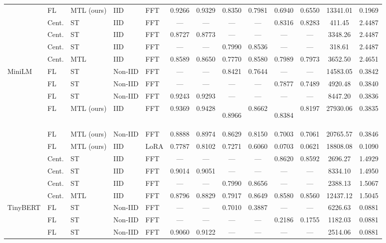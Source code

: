 \begin{table}[t]
\begin{tabular}{lllllcccccccc}
      & FL & MTL (ours) & IID & FFT & 0.9266 & 0.9329 & 0.8350 & 0.7981 & 0.6940 & 0.6550 & 13341.01 & 0.1969 \\
     & Cent. & ST & IID & FFT & --- & --- & --- & --- & 0.8316 & 0.8283 & 411.45 & 2.4487 \\
     & Cent. & ST & IID & FFT & 0.8727 & 0.8773 & --- & --- & --- & --- & 3348.26 & 2.4487 \\
     & Cent. & ST & IID & FFT & --- & --- & 0.7990 & 0.8536 & --- & --- & 318.61 & 2.4487 \\
     & Cent. & MTL & IID & FFT & 0.8589 & 0.8650 & 0.7770 & 0.8580 & 0.7989 & 0.7973 & 3652.50 & 2.4651 \\
    \midrule
    MiniLM \cite{wang2020minilm} & FL & ST & Non-IID & FFT & --- & --- & 0.8421 & 0.7644 & --- & --- & 14583.05 & 0.3842 \\
     & FL & ST & Non-IID & FFT & --- & --- & --- & --- & 0.7877 & 0.7489 & 4920.48 & 0.3840 \\
     & FL & ST & Non-IID & FFT & 0.9243 & 0.9293 & --- & --- & --- & --- & 8447.20 & 0.3836 \\
      & FL & MTL (ours) & IID & FFT & 0.9369 & 0.9428 & \hypertarget{perf:minilm_qqp_fl_iid}{0.8966} & 0.8662 & \hypertarget{perf:minilm_stsb_fl_iid}{0.8384} & 0.8197 & 27930.06 & 0.3835 \\
      & FL & MTL (ours) & Non-IID & FFT & 0.8888 & 0.8974 & 0.8629 & 0.8150 & 0.7003 & 0.7061 & 20765.57 & 0.3846 \\
     & FL & MTL (ours) & IID & LoRA & 0.7787 & 0.8102 & 0.7271 & 0.6060 & 0.0703 & 0.0621 & 18808.08 & 0.1090 \\
     & Cent. & ST & IID & FFT & --- & --- & --- & --- & 0.8620 & 0.8592 & 2696.27 & 1.4929 \\
     & Cent. & ST & IID & FFT & 0.9014 & 0.9051 & --- & --- & --- & --- & 8334.10 & 1.4950 \\
     & Cent. & ST & IID & FFT & --- & --- & 0.7990 & 0.8656 & --- & --- & 2388.13 & 1.5067 \\
     & Cent. & MTL & IID & FFT & 0.8796 & 0.8829 & 0.7917 & 0.8649 & 0.8580 & 0.8560 & 12437.12 & 1.5045 \\
    \midrule
    TinyBERT \cite{jiao2019tinybert} & FL & ST & Non-IID & FFT & --- & --- & 0.7010 & 0.3887 & --- & --- & 6226.63 & 0.0881 \\
     & FL & ST & Non-IID & FFT & --- & --- & --- & --- & 0.2186 & 0.1755 & 1182.03 & 0.0881 \\
     & FL & ST & Non-IID & FFT & 0.9060 & 0.9122 & --- & --- & --- & --- & 2514.06 & 0.0881 \\

\end{tabular}
\end{table}
